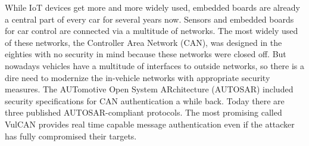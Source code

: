 
While IoT devices get more and more widely used, embedded boards are already a
central part of every car for several years now. Sensors and embedded boards for
car control are connected via a multitude of networks. The most widely used of
these networks, the Controller Area Network (CAN), was designed in the eighties
with no security in mind because these networks were closed off. But nowadays
vehicles have a multitude of interfaces to outside networks, so there is a dire
need to modernize the in-vehicle networks with appropriate security measures.
The AUTomotive Open System ARchitecture (AUTOSAR) included security
specifications for CAN authentication a while back. Today there are three
published AUTOSAR-compliant protocols. The most promising called VulCAN provides
real time capable message authentication even if the attacker has fully
compromised their targets.
